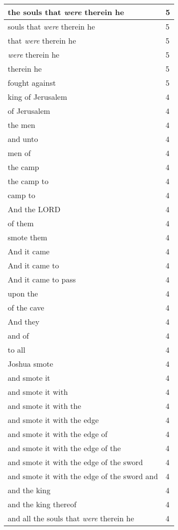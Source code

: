 \begin{center}
\begin{longtable}{|p{3.0in}|p{0.5in}|}
the souls that \emph{were} therein he & 5\\ \hline 
souls that \emph{were} therein he & 5\\ \hline 
that \emph{were} therein he & 5\\ \hline 
\emph{were} therein he & 5\\ \hline 
therein he & 5\\ \hline 
fought against & 5\\ \hline 
king of Jerusalem & 4\\ \hline 
of Jerusalem & 4\\ \hline 
the men & 4\\ \hline 
and unto & 4\\ \hline 
men of & 4\\ \hline 
the camp & 4\\ \hline 
the camp to & 4\\ \hline 
camp to & 4\\ \hline 
And the LORD & 4\\ \hline 
of them & 4\\ \hline 
smote them & 4\\ \hline 
And it came & 4\\ \hline 
And it came to & 4\\ \hline 
And it came to pass & 4\\ \hline 
upon the & 4\\ \hline 
of the cave & 4\\ \hline 
And they & 4\\ \hline 
and of & 4\\ \hline 
to all & 4\\ \hline 
Joshua smote & 4\\ \hline 
and smote it & 4\\ \hline 
and smote it with & 4\\ \hline 
and smote it with the & 4\\ \hline 
and smote it with the edge & 4\\ \hline 
and smote it with the edge of & 4\\ \hline 
and smote it with the edge of the & 4\\ \hline 
and smote it with the edge of the sword & 4\\ \hline 
and smote it with the edge of the sword and & 4\\ \hline 
and the king & 4\\ \hline 
and the king thereof & 4\\ \hline 
and all the souls that \emph{were} therein he & 4\\ \hline 

\end{longtable}
\end{center}

